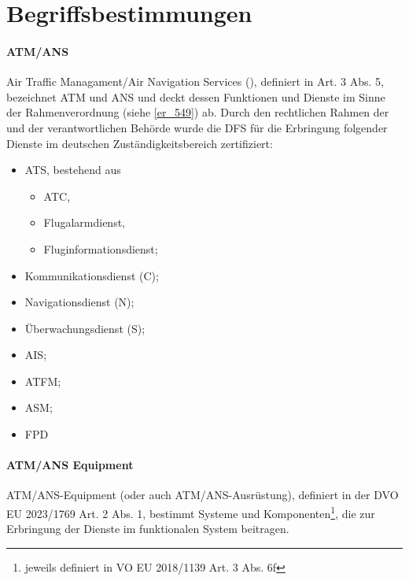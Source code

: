 
\chapter{Begriffsbestimmungen}

\subsubsection{ATM/ANS}\label{beg:atmans}

Air Traffic Managament/Air Navigation Services (\atmans), definiert in  Art. 3 Abs. 5, bezeichnet \acf{ATM} und \acf{ANS} und deckt dessen Funktionen und Dienste im Sinne der Rahmenverordnung (siehe \ref{er_549}) ab.
Durch den rechtlichen Rahmen der  und der verantwortlichen Behörde wurde die DFS für die Erbringung folgender \atmans{} Dienste im deutschen Zuständigkeitsbereich zertifiziert: \cite[17]{ba_technik}
\begin{itemize}
    \item \acf{ATS}, bestehend aus
    \begin{itemize}
        \item \acf{ATC},
        \item Flugalarmdienst,
        \item Fluginformationsdienst;
    \end{itemize}
    \item  Kommunikationsdienst (C);
    \item  Navigationsdienst (N);
    \item  Überwachungsdienst (S);
    \item  \acf{AIS};
    \item  \acf{ATFM};
    \item  \acf{ASM};
    \item  \acf{FPD}
\end{itemize}

\subsubsection{ATM/ANS Equipment}

ATM/ANS-Equipment (oder auch ATM/ANS-Ausrüstung), definiert in der \acf{DVO} \acs{EU} 2023/1769 Art. 2 Abs. 1, bestimmt Systeme und Komponenten\footnote{jeweils definiert in VO EU 2018/1139 Art. 3 Abs. 6f}, die zur Erbringung der Dienste im funktionalen System beitragen.

